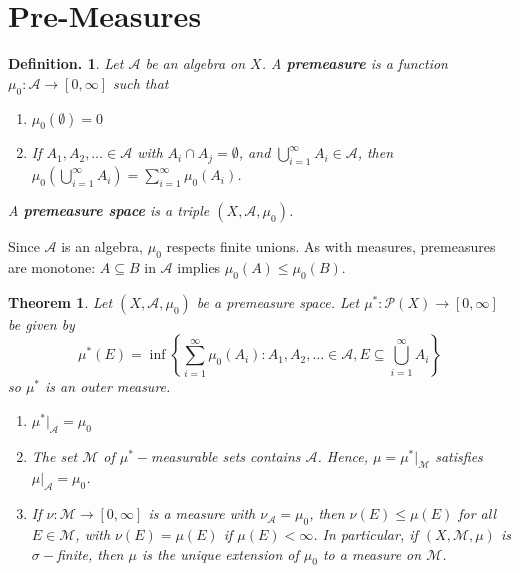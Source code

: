 \documentclass[12pt, a4paper]{memoir}
\newtheorem{theorem}{Theorem}[section]
\theoremstyle{nonumberplain}
\newtheorem{definition}{Definition.}
\begin{document}
\section{Pre-Measures}
\begin{definition}
    Let $\mathcal{A}$ be an algebra on $X$.
    A \textbf{premeasure} is a function $\mu_0:\mathcal{A}\to[0,\infty]$ such that
    \begin{enumerate}[nolistsep,label={(\roman*)}]
        \item $\mu_0(\emptyset)=0$
        \item If $A_1,A_2,\ldots\in\mathcal{A}$ with $A_i\cap A_j=\emptyset$, and $\bigcup_{i=1}^\infty A_i\in \mathcal{A}$, then $\mu_0(\bigcup_{i=1}^\infty A_i)=\sum_{i=1}^\infty \mu_0(A_i)$.
    \end{enumerate}
    A \textbf{premeasure space} is a triple $(X,\mathcal{A},\mu_0)$.
\end{definition}
Since $\mathcal{A}$ is an algebra, $\mu_0$ respects finite unions.
As with measures, premeasures are monotone: $A\subseteq B$ in $\mathcal{A}$ implies $\mu_0(A)\leq\mu_0(B)$.
\begin{theorem}
    Let $(X,\mathcal{A},\mu_0)$ be a premeasure space.
    Let $\mu^*:\mathcal{P}(X)\to[0,\infty]$ be given by
    \begin{equation*}
        \mu^*(E)=\inf\left\{\sum\limits_{i=1}^\infty \mu_0(A_i):A_1,A_2,\ldots\in\mathcal{A},E\subseteq\bigcup_{i=1}^\infty A_i\right\}
    \end{equation*}
    so $\mu^*$ is an outer measure.
    \begin{enumerate}[nolistsep,label=(\roman*)]
        \item $\mu^*|_{\mathcal{A}}=\mu_0$
        \item The set $\mathcal{M}$ of $\mu^*-$measurable sets contains $\mathcal{A}$.
            Hence, $\mu=\mu^*|_{\mathcal{M}}$ satisfies $\mu|_{\mathcal{A}}=\mu_0$.
        \item If $\nu:\mathcal{M}\to[0,\infty]$ is a measure with $\nu_{\mathcal{A}}=\mu_0$, then $\nu(E)\leq\mu(E)$ for all $E\in\mathcal{M}$, with $\nu(E)=\mu(E)$ if $\mu(E)<\infty$.
            In particular, if $(X,\mathcal{M},\mu)$ is $\sigma-$finite, then $\mu$ is the unique extension of $\mu_0$ to a measure on $\mathcal{M}$.
    \end{enumerate}
\end{theorem}
\end{document}
